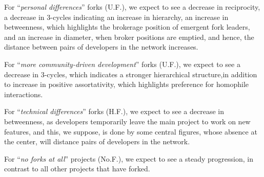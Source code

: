 \documentclass{acm_proc_article-sp}
\begin{document}
For ``\textit{personal differences}'' forks (U.F.), we expect to see a decrease in reciprocity, a decrease in 3-cycles indicating an increase in hierarchy, an increase in betweenness, which highlights the brokerage position of emergent fork leaders, and an increase in diameter, when broker positions are emptied, and hence, the distance between pairs of developers in the network increases. 

For ``\textit{more community-driven development}'' forks (U.F.), we expect to see a decrease in 3-cycles, which indicates a stronger hierarchical structure,in addition to increase in positive assortativity, which highlights preference for homophile interactions.

For  ``\textit{technical differences}'' forks (H.F.), we expect to see a decrease in betweenness, as developers temporarily leave the main project to work on new features, and this, we suppose, is done by some central figures, whose absence at the center, will distance pairs of developers in the network.

For ``\textit{no forks at all}'' projects (No.F.), we expect to see a steady progression, in contrast to all other projects that have forked.
\end{document}
